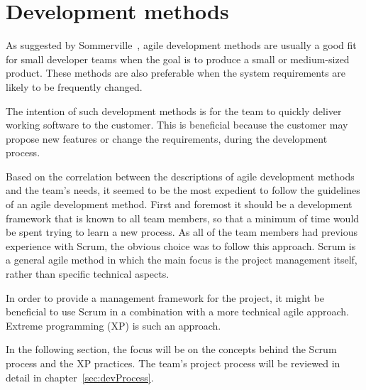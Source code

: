 \section{Development methods}
\label{sec:devMethods}

As suggested by Sommerville~\cite{scrum}, agile development methods are usually a good fit for small developer teams when the goal is to produce a small or medium-sized product. These methods are also preferable when the system requirements are likely to be frequently changed.

The intention of such development methods is for the team to quickly deliver working software to the customer. This is beneficial because the customer may propose new features or change the requirements, during the development process.

Based on the correlation between the descriptions of agile development methods and the team's needs, it seemed to be the most expedient to follow the guidelines of an agile development method. First and foremost it should be a development framework that is known to all team members, so that a minimum of time would be spent trying to learn a new process. As all of the team members had previous experience with Scrum, the obvious choice was to follow this approach. Scrum is a general agile method in which the main focus is the project management itself, rather than specific technical aspects.

In order to provide a management framework for the project, it might be beneficial to use Scrum in a combination with a more technical agile approach. Extreme programming (XP) is such an approach.

In the following section, the focus will be on the concepts behind the Scrum process and the XP practices. The team's project process will be reviewed in detail in chapter~\ref{sec:devProcess}.